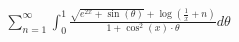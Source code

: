 \documentclass[preview]{standalone}
\begin{document}
\begin{align*}
\sum_{n=1}^{\infty} \int_{0}^{1}  \frac{\sqrt{e^{2x} + \sin(\theta)} + \log\left(\frac{1}{x} + n\right)}{1 + \cos^2(x) \cdot \theta}  d\theta
\end{align*}
\end{document}
